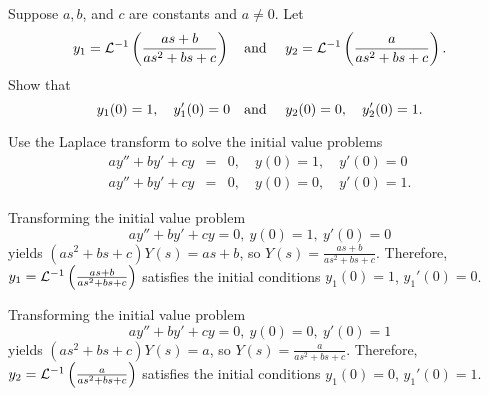 \documentclass{ximera}
\begin{document}
\begin{problem}\label{exer:8.3.38}
Suppose $a,b$, and $c$ are constants and $a\ne0$.  Let
$$
y_1={\cal L}^{-1}\left(as+b\over as^2+bs+c\right)\mbox{\quad and \quad}
y_2={\cal L}^{-1}\left(a\over as^2+bs+c\right).
$$
Show that
$$
y_1(0)=1,\quad y_1'(0)=0\mbox{\quad and \quad} y_2(0)=0,\quad y_2'(0)=1.
$$
\begin{hint}
Use the Laplace transform to solve the initial value
problems
\begin{eqnarray*}
ay''+by'+cy&=&0, \quad   y(0)=1,\quad y'(0)=0 \\
ay''+by'+cy&=&0, \quad  y(0)=0,\quad y'(0)=1.
\end{eqnarray*}
\end{hint}

\begin{solution}
Transforming the initial value problem
$$
ay''+by'+cy=0,\  y(0)=1,\ y'(0)=0
$$
yields
$(as^2+bs+c)Y(s)=as+b$,
so $Y(s)=\frac{as+b}{as^2+bs+c}$. Therefore,
$y_1={\cal L}^{-1}\left(as+b\over as^2+bs+c\right)$
satisfies the initial conditions $y_1(0)=1$, $y_1'(0)=0$.

Transforming the initial value problem
$$
ay''+by'+cy=0,\  y(0)=0,\ y'(0)=1
$$
yields
$(as^2+bs+c)Y(s)=a$,
so $Y(s)=\frac{a}{as^2+bs+c}$. Therefore,
$y_2={\cal L}^{-1}\left(\frac{a}{as^2+bs+c}\right)$
satisfies the initial conditions $y_1(0)=0$, $y_1'(0)=1$.
\end{solution}
\end{problem}
\end{document}
